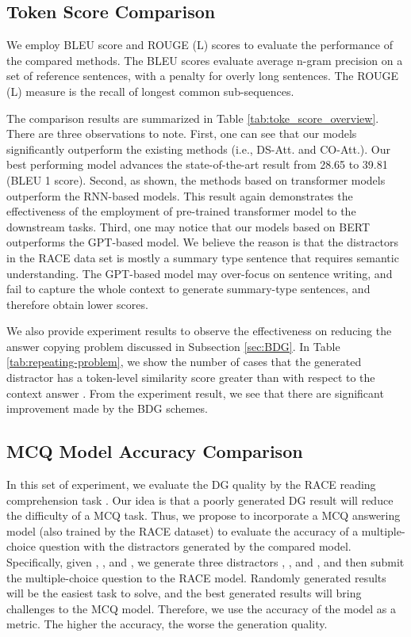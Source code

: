 \documentclass[11pt,a4paper]{article}
\begin{document}
\subsection{Token Score Comparison}
We employ BLEU score \cite{papineni2002bleu} and ROUGE (L) \cite{lin2004rouge} scores to evaluate the performance of the compared methods. The BLEU scores evaluate average n-gram precision on a set of reference sentences, with a penalty for overly long sentences. The ROUGE (L) measure is the recall of longest common sub-sequences.

The comparison results are summarized in Table \ref{tab:toke_score_overview}. There are three observations to note. First, one can see that our models significantly outperform the existing methods (i.e., DS-Att. and CO-Att.). Our best performing model advances the state-of-the-art result from 28.65 to 39.81 (BLEU 1 score). Second, as shown, the methods based on transformer models outperform the RNN-based models. This result again demonstrates the effectiveness of the employment of pre-trained transformer model to the downstream tasks. Third, one may notice that our models based on BERT outperforms the GPT-based model. We believe the reason is that the distractors in the RACE data set is mostly a summary type sentence that requires semantic understanding. The GPT-based model may over-focus on sentence writing, and fail to capture the whole context to generate summary-type sentences, and therefore obtain lower scores. 

We also provide experiment results to observe the effectiveness on reducing the answer copying problem discussed in Subsection \ref{sec:BDG}. In Table \ref{tab:repeating-problem}, we show the number of cases that the generated distractor  has a token-level similarity score greater than  with respect to the context answer . From the experiment result, we see that there are significant improvement made by the BDG schemes.



\subsection{MCQ Model Accuracy Comparison}
In this set of experiment, we evaluate the DG quality by the RACE reading comprehension task \cite{lai2017large}. Our idea is that a poorly generated DG result will reduce the difficulty of a MCQ task. Thus, we propose to incorporate a MCQ answering model (also trained by the RACE dataset) to evaluate the accuracy of a multiple-choice question with the distractors generated by the compared model. Specifically, given , , and , we generate three distractors , , and , and then submit the multiple-choice question to the RACE model. Randomly generated results will be the easiest task to solve, and the best generated results will bring challenges to the MCQ model. Therefore, we use the accuracy of the model as a metric. The higher the accuracy, the worse the generation quality.
\end{document}
